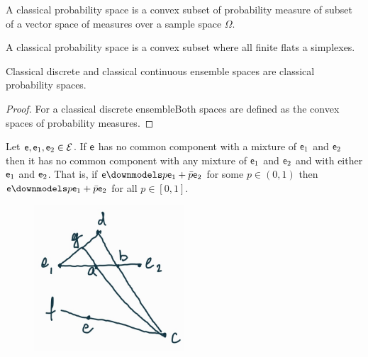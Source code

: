 \begin{defn}
	A classical probability space is a convex subset of probability measure of subset of a vector space of measures over a sample space $\Omega$.
\end{defn}

\begin{defn}
	A classical probability space is a convex subset where all finite flats a simplexes.
\end{defn}

\begin{coro}
	Classical discrete and classical continuous ensemble spaces are classical probability spaces.
\end{coro}

\begin{proof}
	For a classical discrete ensembleBoth spaces are defined as the convex spaces of probability measures.
\end{proof}

\begin{prop}\label{pm_es_separateExtendsMixtures}
	Let $\mathsf{e},\mathsf{e}_1,\mathsf{e}_2 \in \mathcal{E}$. If $\mathsf{e}$ has no common component with a mixture of $\mathsf{e}_1$ and $\mathsf{e}_2$ then it has no common component with any mixture of $\mathsf{e}_1$ and $\mathsf{e}_2$ and with either $\mathsf{e}_1$ and $\mathsf{e}_2$. That is, if $\ens \separate p \ens_1 + \bar{p} \ens_2$ for some $p \in (0, 1)$ then $\ens \separate p \ens_1 + \bar{p} \ens_2$ for all $p \in [0, 1]$.
\end{prop}

\begin{figure}[h]
	\includegraphics[width=0.5\textwidth]{tempimages/DistinctAndMixture.jpg}
\end{figure}

